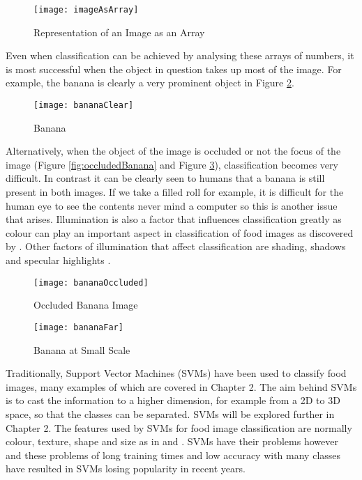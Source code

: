 \begin{figure}[h]
	\centering
	\texttt{[image: imageAsArray]}
	\caption{Representation of an Image as an Array}
	\label{fig:imageArray}
\end{figure}

Even when classification can be achieved by analysing these arrays of numbers, it is most successful when the object in question takes up most of the image.
For example, the banana is clearly a very prominent object in Figure \ref{fig:bananaClear}.

\begin{figure}[h]
  \centering
	\texttt{[image: bananaClear]}
	\caption{Banana}
	\label{fig:bananaClear}
\end{figure}

Alternatively, when the object of the image is occluded or not the focus of the image (Figure \ref{fig:occludedBanana} and Figure \ref{fig:farBanana}), classification becomes very difficult.
In contrast it can be clearly seen to humans that a banana is still present in both images.
If we take a filled roll for example, it is difficult for the human eye to see the contents never mind a computer so this is another issue that arises.
Illumination is also a factor that influences classification greatly as colour can play an important aspect in classification of food images as discovered by \parencite{novelSVM}.
Other factors of illumination that affect classification are shading, shadows and specular highlights \parencite{dynamicGong}.

\begin{figure}[h] 
  \label{ fig7} 
  \begin{minipage}[h]{0.5\linewidth}
    \centering
    \texttt{[image: bananaOccluded]} 
    \caption{Occluded Banana Image} 
  \label{fig:occludedBanana}
    \vspace{4ex}
  \end{minipage}%
  \begin{minipage}[h]{0.5\linewidth}
    \centering
    \texttt{[image: bananaFar]} 
    \caption{Banana at Small Scale} 
  \label{fig:farBanana}
    \vspace{4ex}
  \end{minipage} 
\end{figure}

Traditionally, Support Vector Machines (SVMs) have been used to classify food images, many examples of which are covered in Chapter 2.
The aim behind SVMs is to cast the information to a higher dimension, for
example from a 2D to 3D space, so that the classes can be separated. SVMs will be explored further in Chapter 2.
The features used by SVMs for food image classification are normally colour, texture, shape and size as in \parencite{pouladzadeh2014measuring} and \parencite{novelSVM}.
SVMs have their problems however and these problems of long training times and low accuracy with many classes have resulted in SVMs losing popularity in recent years.

